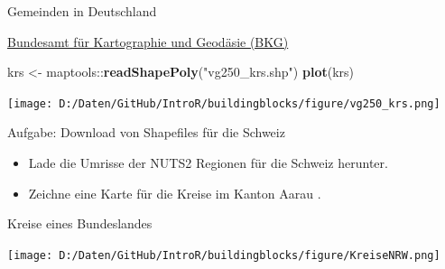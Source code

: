 \documentclass[ignorenonframetext,]{beamer}
\newenvironment{Shaded}{\begin{snugshade}}{\end{snugshade}}
\newcommand{\KeywordTok}[1]{\textcolor[rgb]{0.26,0.66,0.93}{\textbf{#1}}}
\newcommand{\DecValTok}[1]{\textcolor[rgb]{0.27,0.67,0.26}{#1}}
\newcommand{\StringTok}[1]{\textcolor[rgb]{0.02,0.61,0.04}{#1}}
\newcommand{\OperatorTok}[1]{\textcolor[rgb]{0.74,0.68,0.62}{#1}}
\newcommand{\NormalTok}[1]{\textcolor[rgb]{0.74,0.68,0.62}{#1}}
\providecommand{\tightlist}{%
  \setlength{\itemsep}{0pt}\setlength{\parskip}{0pt}}
\begin{document}
\begin{frame}[fragile]{Gemeinden in Deutschland}

\href{http://www.geodatenzentrum.de/geodaten/gdz_rahmen.gdz_div?gdz_spr=deu\&gdz_akt_zeile=5\&gdz_anz_zeile=1\&gdz_unt_zeile=15\&gdz_user_id=0}{Bundesamt
für Kartographie und Geodäsie (BKG)}

\begin{Shaded}
\begin{Highlighting}[]
\NormalTok{krs <-}\StringTok{ }\NormalTok{maptools}\OperatorTok{::}\KeywordTok{readShapePoly}\NormalTok{(}\StringTok{"vg250_krs.shp"}\NormalTok{)}
\KeywordTok{plot}\NormalTok{(krs)}
\end{Highlighting}
\end{Shaded}

\texttt{[image: D:/Daten/GitHub/IntroR/buildingblocks/figure/vg250\_krs.png]}

\end{frame}

\begin{frame}{Aufgabe: Download von Shapefiles für die Schweiz}

\begin{itemize}
\tightlist
\item
  Lade die Umrisse der NUTS2 Regionen für die Schweiz herunter.
\item
  Zeichne eine Karte für die Kreise im Kanton Aarau .
\end{itemize}

\end{frame}

\begin{frame}[fragile]{Kreise eines Bundeslandes}

\begin{Shaded}
\end{Shaded}

\texttt{[image: D:/Daten/GitHub/IntroR/buildingblocks/figure/KreiseNRW.png]}

\end{frame}
\end{document}
